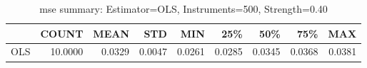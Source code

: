 \begin{table}[ht]
\centering
\caption{mse summary: Estimator=OLS, Instruments=500, Strength=0.40}
\begin{tabular}{lrrrrrrrr}
\toprule
 & COUNT & MEAN & STD & MIN & 25\% & 50\% & 75\% & MAX \\
\midrule
OLS & 10.0000 & 0.0329 & 0.0047 & 0.0261 & 0.0285 & 0.0345 & 0.0368 & 0.0381 \\
\bottomrule
\end{tabular}
\end{table}
